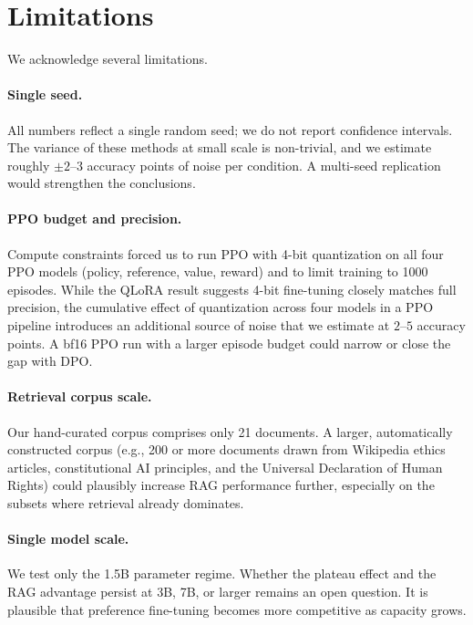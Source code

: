 \section{Limitations}
\label{sec:limitations}

We acknowledge several limitations.

\paragraph{Single seed.} All numbers reflect a single random seed; we do not report confidence intervals. The variance of these methods at small scale is non-trivial, and we estimate roughly $\pm 2$--$3$ accuracy points of noise per condition. A multi-seed replication would strengthen the conclusions.

\paragraph{PPO budget and precision.} Compute constraints forced us to run PPO with 4-bit quantization on all four PPO models (policy, reference, value, reward) and to limit training to 1000 episodes. While the QLoRA result \citep{dettmers2023qlora} suggests 4-bit fine-tuning closely matches full precision, the cumulative effect of quantization across four models in a PPO pipeline introduces an additional source of noise that we estimate at $2$--$5$ accuracy points. A bf16 PPO run with a larger episode budget could narrow or close the gap with DPO.

\paragraph{Retrieval corpus scale.} Our hand-curated corpus comprises only 21 documents. A larger, automatically constructed corpus (e.g., 200 or more documents drawn from Wikipedia ethics articles, constitutional AI principles, and the Universal Declaration of Human Rights) could plausibly increase RAG performance further, especially on the subsets where retrieval already dominates.

\paragraph{Single model scale.} We test only the 1.5B parameter regime. Whether the plateau effect and the RAG advantage persist at 3B, 7B, or larger remains an open question. It is plausible that preference fine-tuning becomes more competitive as capacity grows.

